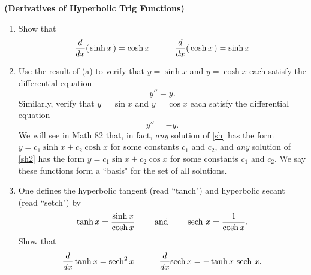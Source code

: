 \documentclass[12pt,letterpaper]{hmcpset}
\begin{document}
\begin{problem}[6]
\textbf{(Derivatives of Hyperbolic Trig Functions)}
\begin{enumerate}[label=(\alph*)]
\item Show that 
$$\frac{d}{dx} (\, \sinh x \,) = \cosh x \hskip 30 pt \frac{d}{dx} ( \, \cosh x \,) = \sinh x$$
\item Use the result of (a) to verify that  $y = \sinh x$ and $y = \cosh x$ each satisfy the differential equation
\begin{equation}
  y'' = y.
  \label{sh}
  \end{equation}
Similarly, verify that $y = \sin x$ and $y = \cos x$ each satisfy the differential equation
\begin{equation}
 y'' = -y.
   \label{sh2}
  \end{equation}
We will see in Math 82 that, in fact,  \textit{any} solution of \eqref{sh} has the form $y = c_1 \sinh x + c_2 \cosh x$ for some constants $c_1$ and $c_2$, and \textit{any} solution of \eqref{sh2} has the form $y = c_1 \sin x + c_2 \cos x$ for some constants $c_1$ and $c_2$. We say these functions form a ``basis" for the set of all solutions. 
\item One defines the hyperbolic tangent (read ``tanch") and hyperbolic secant (read ``setch") by 
$$\tanh x = \frac{\sinh x}{\cosh x} \qquad \text{ and } \qquad  {\rm sech}\ x = \frac{1}{\cosh x}. $$
Show that
$$\frac{d}{dx}\tanh x = {\rm sech}^2\, x\hskip 30 pt 
\frac{d}{dx} {\rm sech}\, x = -\tanh x\ {\rm sech}\ x.$$
\end{enumerate}
\end{problem}
\begin{solution}
\end{solution}
\end{document}
